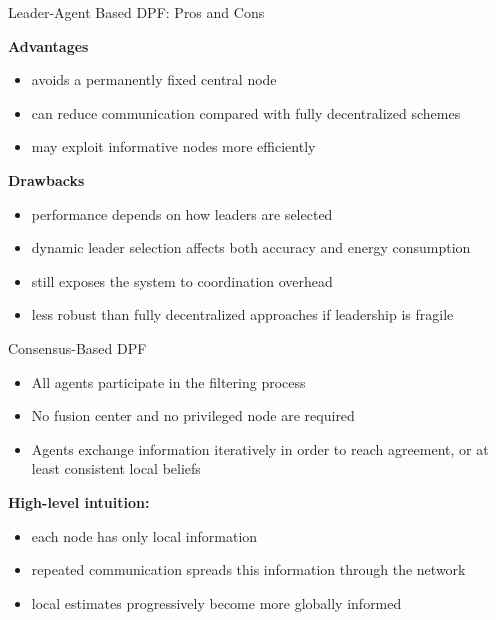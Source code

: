 \documentclass[aspectratio=169]{beamer}
\begin{document}

\begin{frame}{Leader-Agent Based DPF: Pros and Cons}

\textbf{Advantages}
\begin{itemize}
    \item avoids a permanently fixed central node
    \item can reduce communication compared with fully decentralized schemes
    \item may exploit informative nodes more efficiently
\end{itemize}

\vspace{0.3cm}

\textbf{Drawbacks}
\begin{itemize}
    \item performance depends on how leaders are selected
    \item dynamic leader selection affects both accuracy and energy consumption
    \item still exposes the system to coordination overhead
    \item less robust than fully decentralized approaches if leadership is fragile
\end{itemize}


\end{frame}


\begin{frame}{Consensus-Based DPF}

\begin{itemize}
    \item All agents participate in the filtering process
    \item No fusion center and no privileged node are required
    \item Agents exchange information iteratively in order to reach agreement, or at least consistent local beliefs
\end{itemize}

\vspace{0.3cm}

\textbf{High-level intuition:}
\begin{itemize}
    \item each node has only local information
    \item repeated communication spreads this information through the network
    \item local estimates progressively become more globally informed
\end{itemize}

\end{frame}
\end{document}
